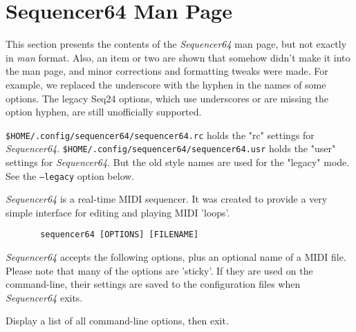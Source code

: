 %
%
%

\section{Sequencer64 Man Page}
\label{sec:seq64_man_page}

   This section presents the contents of the \textsl{Sequencer64} man page, but
   not exactly in \textsl{man} format.  Also, an item or two are shown that
   somehow didn't make it into the man page, and minor corrections and
   formatting tweaks were made.
   For example, we replaced the underscore with the hyphen in the names of some
   options.  The legacy Seq24 options, which use underscores or are missing the
   option hyphen, are still unofficially supported.

   \texttt{\$HOME/.config/sequencer64/sequencer64.rc} holds the "rc" settings
   for \textsl{Sequencer64}.
   \texttt{\$HOME/.config/sequencer64/sequencer64.usr} holds the "user" settings
   for \textsl{Sequencer64}.
   But the old style names are used for the "legacy" mode.  See the
   \texttt{--legacy} option below.

   \textsl{Sequencer64} is a real-time MIDI sequencer. It was created to
   provide a very simple interface for editing and playing MIDI 'loops'.

   \begin{verbatim}
       sequencer64 [OPTIONS] [FILENAME]
   \end{verbatim}

   \textsl{Sequencer64} accepts the following options, plus an optional name of
   a MIDI file.  Please note that many of the options are 'sticky'.  If they
   are used on the command-line, their settings are saved to the configuration
   files when \textsl{Sequencer64} exits.

   \setcounter{ItemCounter}{0}      %

      Display a list of all command-line options, then exit.

